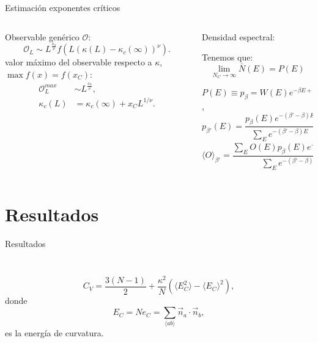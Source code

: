 \documentclass[xcolor=dvipsnames]{beamer}
\begin{document}
\begin{frame}{Estimación exponentes críticos}
\begin{columns}
  \begin{column}{5.8cm}
    Observable genérico $\mathcal{O}$:
    \begin{equation*}
      \mathcal{O}_L\sim L^{\frac{x_0}{\nu}}f(L (\kappa(L)-\kappa_c(\infty))^{\nu}).
    \end{equation*}
  valor máximo del observable respecto a $\kappa$, $\max f(x)=f(x_C)$:
  \begin{align*}
    \mathcal{O}^{max}_L& \sim L^{\frac{x_0}{\nu}},\\
    \kappa_c(L)&=\kappa_c(\infty)+x_CL^{1/\nu}.
  \end{align*}
  \end{column}
  \begin{column}{5.8cm}
    {\color{fblue} Densidad espectral:}

    Tenemos que:
    \begin{equation*}
      \lim _{N_C\rightarrow \infty}\bar{N}(E)=P(E)
    \end{equation*}

    $P(E)\equiv p_{\beta}=W(E)e^{-\beta E+f}$,
    \begin{equation*}
      p_{\beta'}(E)=\frac{p_{\beta}(E)e^{-(\beta'-\beta)E}}{\sum_E e^{-(\beta'-\beta)E}},
    \end{equation*}
    \centering
    \begin{equation*}
      \langle O\rangle_{\beta'}=\frac{\sum_E  O(E)p_{\beta}(E) e^{-(\beta'-\beta)E}}{\sum_E e^{-(\beta'-\beta)E}},
    \end{equation*}
  \end{column}
\end{columns}
\end{frame}

\section{Resultados}
\begin{frame}{Resultados}
\begin{columns}
  \begin{column}{5.8cm}
    \begin{figure}[h]
      \centering
      \resizebox{\columnwidth}{!}{}
    \end{figure}
  \end{column}
  \begin{column}{5.8cm}
    \begin{figure}[h]
      \centering
     \resizebox{\columnwidth}{!}{ }
    \end{figure}
  \end{column}
\end{columns}
\begin{equation*}
 C_V=\frac{3(N-1)}{2}+\frac{\kappa^2}{N}(\langle E_C^2 \rangle-\langle E_C
\rangle^2),
\end{equation*}
donde
\begin{equation*}
E_C=Ne_C=\sum_{\langle ab \rangle}\vec{n}_a\cdot\vec{n}_b, 
\end{equation*}
es la energía de curvatura.
\end{frame}
\end{document}
